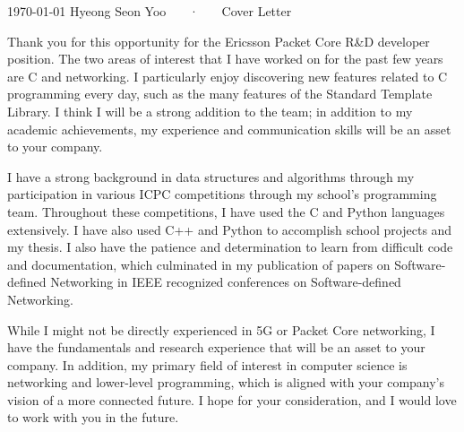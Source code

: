 \documentclass[11pt, a4paper]{russell}
\begin{document}
\makecvheader[L]

\makecvfooter
  {\today}
  {Hyeong Seon Yoo ~~~·~~~ Cover Letter}
  {}

\makelettertitle

\begin{cvletter}
    Thank you for this opportunity for the Ericsson Packet Core R\&D developer position. The two areas of interest that I have worked on for the past few years are C\+\+ and networking. I particularly enjoy discovering new features related to C\+\+ programming every day, such as the many features of the Standard Template Library. I think I will be a strong addition to the team; in addition to my academic achievements, my experience and communication skills will be an asset to your company.

    I have a strong background in data structures and algorithms through my participation in various ICPC competitions through my school's programming team. Throughout these competitions, I have used the C\+\+ and Python languages extensively. I have also used C++ and Python to accomplish school projects and my thesis. I also have the patience and determination to learn from difficult code and documentation, which culminated in my publication of papers on Software-defined Networking in IEEE recognized conferences on Software-defined Networking.

    While I might not be directly experienced in 5G or Packet Core networking, I have the fundamentals and research experience that will be an asset to your company. In addition, my primary field of interest in computer science is networking and lower-level programming, which is aligned with your company's vision of a more connected future. I hope for your consideration, and I would love to work with you in the future.
\end{cvletter}


\makeletterclosing
\end{document}
